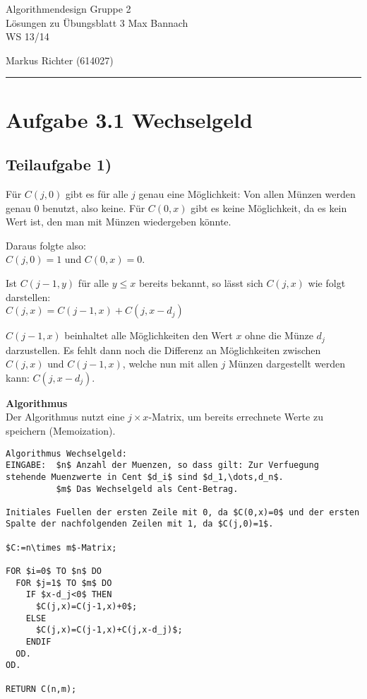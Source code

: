 \documentclass[a4paper, fontsize=10pt]{scrartcl}
\begin{document}
 

{\large Algorithmendesign \hfill Gruppe 2}\\  
{\large Lösungen zu Übungsblatt 3} \hfill Max Bannach\\
{\large WS 13/14}
\begin{flushright}Markus Richter (614027)\end{flushright}
\rule{\textwidth}{.3mm}

\section*{Aufgabe 3.1 Wechselgeld}
\subsection*{Teilaufgabe 1)}
Für $C(j,0)$ gibt es für alle $j$ genau eine Möglichkeit: Von allen Münzen werden genau 0 benutzt, also keine. Für $C(0,x)$ gibt es keine Möglichkeit, da es kein Wert ist, den man mit Münzen wiedergeben könnte.\bigskip

Daraus folgte also:\\
$C(j,0)=1$ und $C(0,x)=0$.\bigskip

Ist $C(j-1,y)$ für alle $y\leq  x$ bereits bekannt, so lässt sich $C(j,x)$ wie folgt darstellen:\\
$C(j,x)=C(j-1,x)+C(j,x-d_j)$\bigskip

$C(j-1,x)$ beinhaltet alle Möglichkeiten den Wert $x$ ohne die Münze $d_j$ darzustellen. Es fehlt dann noch die Differenz an Möglichkeiten zwischen $C(j,x)$ und $C(j-1,x)$, welche nun mit allen $j$ Münzen dargestellt werden kann: $C(j,x-d_j)$.\bigskip

\textbf{Algorithmus}\\
Der Algorithmus nutzt eine $j\times x$-Matrix, um bereits errechnete Werte zu speichern (Memoization).\bigskip


\begin{lstlisting}[mathescape]
Algorithmus Wechselgeld:
EINGABE:  $n$ Anzahl der Muenzen, so dass gilt: Zur Verfuegung stehende Muenzwerte in Cent $d_i$ sind $d_1,\dots,d_n$.
          $m$ Das Wechselgeld als Cent-Betrag.
          
Initiales Fuellen der ersten Zeile mit 0, da $C(0,x)=0$ und der ersten Spalte der nachfolgenden Zeilen mit 1, da $C(j,0)=1$.

$C:=n\times m$-Matrix;

FOR $i=0$ TO $n$ DO
  FOR $j=1$ TO $m$ DO
    IF $x-d_j<0$ THEN
      $C(j,x)=C(j-1,x)+0$;
    ELSE
      $C(j,x)=C(j-1,x)+C(j,x-d_j)$;
    ENDIF
  OD.
OD.

RETURN C(n,m);

\end{lstlisting}
\bigskip
\end{document}
